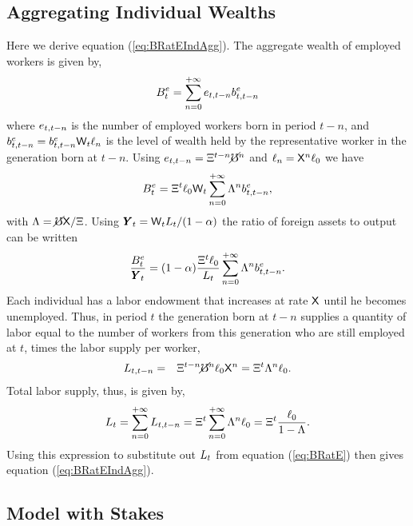 \documentclass[titlepage,abstract,letterpaper]{econtex}
\renewcommand{\GDPLev}{\ensuremath{\pmb{Y}}}
\begin{document}
\subsection{Aggregating Individual Wealths}

Here we derive equation (\ref{eq:BRatEIndAgg}). The aggregate wealth of employed workers is given by,
\begin{equation*}
B^{e}_t=\sum_{n=0}^{+\infty} e_{t,t-n} b^{e}_{t,t-n}
\end{equation*}
where $e_{t,t-n}$ is the number of employed workers born in period $t-n$, and
$b^{e}_{t,t-n}=b^{e}_{t,t-n}\mathsf{W}_t \ell_{n}$ is the level of wealth held by the representative worker in the generation born at $t-n$. Using $e_{t,t-n}=\Xi^{t-n}\cancel{\mho}^{n}$ and $\ell_{n}=\mathsf{X}^{n}\ell_0$ we have
\begin{equation*}
B^{e}_t = \Xi^t \ell_0 \mathsf{W}_t
\sum_{n=0}^{+\infty}\Lambda^{n} b^{e}_{t,t-n},
\end{equation*}
with $\Lambda = \cancel{\mho} \mathsf{X} / \Xi$.
Using $\GDPLev_t=\Wage_t \LLev_t/(1-\kapShare)$ the ratio of foreign assets to output can be written
\begin{equation}
\frac{\BLevE_t}{\GDPLev_t}=(1-\kapShare) \frac{\EmpGro^t \labor_0} {\LLev_t} \sum_{n=0}^{+\infty}\LGro^{n} \bRatE_{t,t-n}.
\label{eq:BRatE}
\end{equation}
Each individual has a labor endowment that increases at rate $\mathsf{X}$ until he becomes unemployed. Thus, in period $t$ the generation born at $t-n$ supplies a quantity of labor equal to the number of workers from this generation who are still employed at $t$, times the labor supply per worker,
\begin{eqnarray*}
L_{t,t-n} & = & \Xi^{t-n}\cancel{\mho}^{n} \ell_0 \mathsf{X}^{n}
= \Xi^{t} \Lambda^{n}\ell_0 .
\end{eqnarray*}
Total labor supply, thus, is given by,
\begin{equation}
L_t  =  \sum_{n=0}^{+\infty}L_{t,t-n}  = \Xi^{t} \sum_{n=0}^{+\infty} \Lambda^{n} \ell_0
=\Xi^{t} \frac{\ell_0}{1-\Lambda}.
\label{eq:LLev}
\end{equation}
Using this expression to substitute out $L_t$ from equation (\ref{eq:BRatE}) then gives equation  (\ref{eq:BRatEIndAgg}).

\subsection{Model with Stakes}
\end{document}
